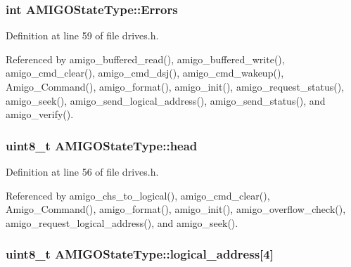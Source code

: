 \subsubsection[{\texorpdfstring{Errors}{Errors}}]{\setlength{\rightskip}{0pt plus 5cm}int A\+M\+I\+G\+O\+State\+Type\+::\+Errors}\hypertarget{structAMIGOStateType_ad04b5b3ffd8fabff547e6498d534feac}{}\label{structAMIGOStateType_ad04b5b3ffd8fabff547e6498d534feac}


Definition at line 59 of file drives.\+h.



Referenced by amigo\+\_\+buffered\+\_\+read(), amigo\+\_\+buffered\+\_\+write(), amigo\+\_\+cmd\+\_\+clear(), amigo\+\_\+cmd\+\_\+dsj(), amigo\+\_\+cmd\+\_\+wakeup(), Amigo\+\_\+\+Command(), amigo\+\_\+format(), amigo\+\_\+init(), amigo\+\_\+request\+\_\+status(), amigo\+\_\+seek(), amigo\+\_\+send\+\_\+logical\+\_\+address(), amigo\+\_\+send\+\_\+status(), and amigo\+\_\+verify().

\subsubsection[{\texorpdfstring{head}{head}}]{\setlength{\rightskip}{0pt plus 5cm}uint8\+\_\+t A\+M\+I\+G\+O\+State\+Type\+::head}\hypertarget{structAMIGOStateType_a92b01a4e3912d2fcacebcc15a21c66c9}{}\label{structAMIGOStateType_a92b01a4e3912d2fcacebcc15a21c66c9}


Definition at line 56 of file drives.\+h.



Referenced by amigo\+\_\+chs\+\_\+to\+\_\+logical(), amigo\+\_\+cmd\+\_\+clear(), Amigo\+\_\+\+Command(), amigo\+\_\+format(), amigo\+\_\+init(), amigo\+\_\+overflow\+\_\+check(), amigo\+\_\+request\+\_\+logical\+\_\+address(), and amigo\+\_\+seek().

\subsubsection[{\texorpdfstring{logical\+\_\+address}{logical_address}}]{\setlength{\rightskip}{0pt plus 5cm}uint8\+\_\+t A\+M\+I\+G\+O\+State\+Type\+::logical\+\_\+address\mbox{[}4\mbox{]}}\hypertarget{structAMIGOStateType_a924a685ad68765a91714aa6ad4b20d9f}{}\label{structAMIGOStateType_a924a685ad68765a91714aa6ad4b20d9f}


